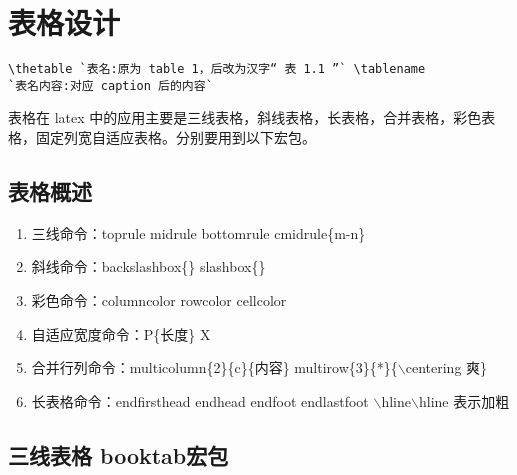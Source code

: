 \section{表格设计}


\begin{lstlisting}[language={[LaTeX]TeX}]
\thetable `表名:原为 table 1，后改为汉字“ 表 1.1 ”` \tablename
`表名内容:对应 caption 后的内容`
\end{lstlisting}
表格在 latex
中的应用主要是三线表格，斜线表格，长表格，合并表格，彩色表格，固定列宽自适应表格。分别要用到以下宏包。

\subsection{表格概述}


 {
\parbox{12cm}{
\begin{enumerate}
  \item 三线命令：toprule midrule bottomrule cmidrule\{m-n\}
  \item 斜线命令：backslashbox\{\}  slashbox\{\}
  \item 彩色命令：columncolor rowcolor cellcolor
  \item 自适应宽度命令：P\{长度\} X
  \item 合并行列命令：multicolumn\{2\}\{c\}\{内容\} multirow\{3\}\{*\}\{$\backslash$centering 爽\}
  \item 长表格命令：endfirsthead endhead endfoot endlastfoot $\backslash$hline$\backslash$hline 表示加粗
\end{enumerate}
} }


\subsection{三线表格 booktab宏包}

